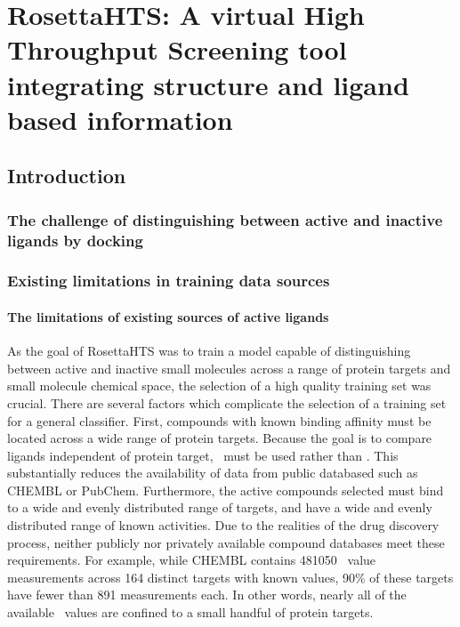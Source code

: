 \chapter{RosettaHTS: A virtual High Throughput Screening tool integrating structure and ligand based information}

\section{Introduction}

\subsection{The challenge of distinguishing between active and inactive ligands by docking}

\subsection{Existing limitations in training data sources}

\subsubsection{The limitations of existing sources of active ligands}
As the goal of RosettaHTS was to train a model capable of distinguishing between active and inactive small molecules across a range of protein targets and small molecule chemical space, the selection of a high quality training set was crucial.
There are several factors which complicate the selection of a training set for a general classifier.
First, compounds with known binding affinity must be located across a wide range of protein targets.
Because the goal is to compare ligands independent of protein target, \ki\ must be used rather than \ic.
This substantially reduces the availability of data from public databased such as CHEMBL or PubChem. 
Furthermore, the active compounds selected must bind to a wide and evenly distributed range of targets, and have a wide and evenly distributed range of known activities.
Due to the realities of the drug discovery process, neither publicly nor privately available compound databases meet these requirements.
For example, while CHEMBL contains 481050 \ki\ value measurements across 164 distinct targets with known \ki values, 90\% of these targets have fewer than 891 measurements each.
In other words, nearly all of the available \ki\ values are confined to a small handful of protein targets.

